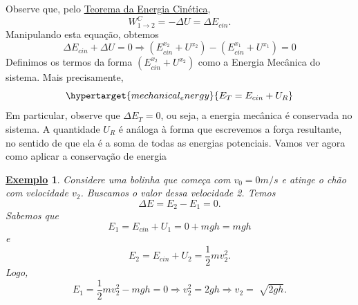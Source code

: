 \documentclass{article}
\newtheorem{example}{\underline{Exemplo}}
\begin{document}
      Observe que, pelo \hyperlink{work_kin_3d}{Teorema da Energia Cinética}, 
        \[
          W_{1\rightarrow2}^{C} = -\Delta U = \Delta E_{cin}.
        \]
      Manipulando esta equa\c cão, obtemos 
        \[
          \Delta E_{cin} + \Delta U = 0 \Rightarrow (E_{cin}^{x_2} + U^{x_2}) - (E_{cin}^{x_1} + U^{x_1}) = 0
        \]
        Definimos os termos da forma \((E_{cin}^{x_2} + U^{x_2})\) como a Energia Mecânica do sistema. Mais precisamente, 
        \[
          \hypertarget{mechanical_energy}{E_{T} = E_{cin} + U_{R}}
        \] 
        Em particular, observe que \(\Delta E_{T} = 0\), ou seja, a energia
        mecânica é conservada no sistema. A quantidade \(U_{R}\) é análoga à 
        forma que escrevemos a for\c ca resultante, no sentido de que ela é a soma
        de todas as energias potenciais. Vamos ver agora como aplicar a conserva\c cão de energia
       \begin{example}
         Considere uma bolinha que come\c ca com \(v_{0} = 0m/s\) e atinge o chão com velocidade
         \(v_{2}\). Buscamos o valor dessa velocidade 2. Temos 
           \[
             \Delta E = E_{2} - E_{1} = 0.
           \]
          Sabemos que 
            \[
              E_{1} = E_{cin} + U_{1} = 0 + mgh = mgh
            \]
          e 
            \[
              E_{2} = E_{cin} + U_{2} = \frac{1}{2}mv_{2}^{2}.
            \]
          Logo, 
            \[
              E_{1} = \frac{1}{2}mv_{2}^{2} - mgh = 0 \Rightarrow v_{2}^{2} = 2gh \Rightarrow v_{2} = \sqrt[]{2gh}.
            \]
       \end{example}
\end{document}
